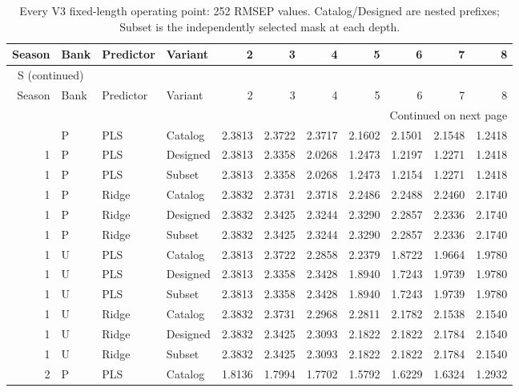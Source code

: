 \documentclass[10pt,a4paper]{article}
\renewcommand{\thetable}{S\arabic{table}}
\begin{document}
\clearpage
\begin{landscape}
\begingroup\footnotesize
\setlength{\tabcolsep}{3.5pt}
\renewcommand{\arraystretch}{1.10}
\begin{longtable}{rlllrrrrrrr}
\caption{Every V3 fixed-length operating point: 252 RMSEP values. Catalog/Designed are nested prefixes; Subset is the independently selected mask at each depth.}\label{tab:v3fixed}\\
\toprule
Season & Bank & Predictor & Variant & 2 & 3 & 4 & 5 & 6 & 7 & 8 \\
\midrule
\endfirsthead
\multicolumn{11}{l}{\tablename~\thetable{} (continued)}\\
\toprule
Season & Bank & Predictor & Variant & 2 & 3 & 4 & 5 & 6 & 7 & 8 \\
\midrule
\endhead
\midrule
\multicolumn{11}{r}{Continued on next page}\\
\endfoot
\bottomrule
\endlastfoot
1 & P & PLS & Catalog & 2.3813 & 2.3722 & 2.3717 & 2.1602 & 2.1501 & 2.1548 & 1.2418 \\
1 & P & PLS & Designed & 2.3813 & 2.3358 & 2.0268 & 1.2473 & 1.2197 & 1.2271 & 1.2418 \\
1 & P & PLS & Subset & 2.3813 & 2.3358 & 2.0268 & 1.2473 & 1.2154 & 1.2271 & 1.2418 \\
1 & P & Ridge & Catalog & 2.3832 & 2.3731 & 2.3718 & 2.2486 & 2.2488 & 2.2460 & 2.1740 \\
1 & P & Ridge & Designed & 2.3832 & 2.3425 & 2.3244 & 2.3290 & 2.2857 & 2.2336 & 2.1740 \\
1 & P & Ridge & Subset & 2.3832 & 2.3425 & 2.3244 & 2.3290 & 2.2857 & 2.2336 & 2.1740 \\
1 & U & PLS & Catalog & 2.3813 & 2.3722 & 2.2858 & 2.2379 & 1.8722 & 1.9664 & 1.9780 \\
1 & U & PLS & Designed & 2.3813 & 2.3358 & 2.3428 & 1.8940 & 1.7243 & 1.9739 & 1.9780 \\
1 & U & PLS & Subset & 2.3813 & 2.3358 & 2.3428 & 1.8940 & 1.7243 & 1.9739 & 1.9780 \\
1 & U & Ridge & Catalog & 2.3832 & 2.3731 & 2.2968 & 2.2811 & 2.1782 & 2.1538 & 2.1540 \\
1 & U & Ridge & Designed & 2.3832 & 2.3425 & 2.3093 & 2.1822 & 2.1822 & 2.1784 & 2.1540 \\
1 & U & Ridge & Subset & 2.3832 & 2.3425 & 2.3093 & 2.1822 & 2.1822 & 2.1784 & 2.1540 \\
2 & P & PLS & Catalog & 1.8136 & 1.7994 & 1.7702 & 1.5792 & 1.6229 & 1.6324 & 1.2932 \\

\end{longtable}
\end{landscape}
\end{document}
